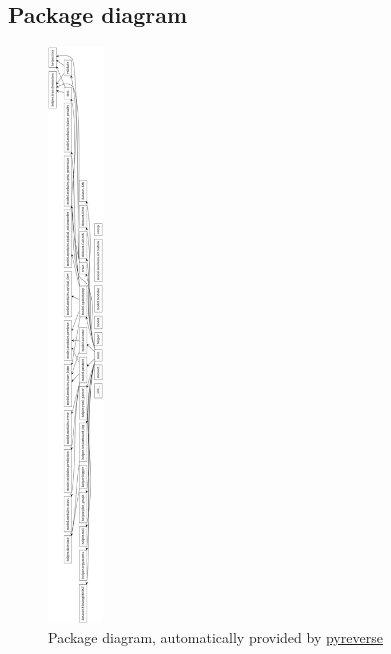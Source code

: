  \subsection*{Package diagram}
  \begin{figure}[H]
   \includegraphics[width=0.13\textwidth]{../Images/packagediagram.png}
   \centering
   \caption{Package diagram, automatically provided by \href{https://pypi.org/project/pyreverse/}{pyreverse}}
   \label{fig:tree}
  \end{figure}\noindent

